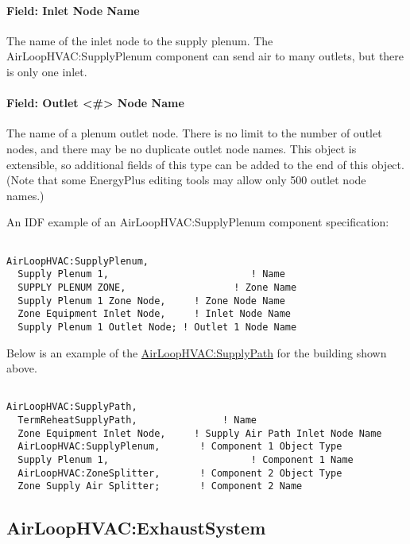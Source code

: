 \paragraph{Field: Inlet Node Name}\label{field-inlet-node-name-1}

The name of the inlet node to the supply plenum. The AirLoopHVAC:SupplyPlenum component can send air to many outlets, but there is only one inlet.

\paragraph{Field: Outlet \textless{}\#\textgreater{} Node Name}\label{field-outlet-node-name-1-000}

The name of a plenum outlet node. There is no limit to the number of outlet nodes, and there may be no duplicate outlet node names.  This object is extensible, so additional fields of this type can be added to the end of this object. (Note that some EnergyPlus editing tools may allow only 500 outlet node names.)

An IDF example of an AirLoopHVAC:SupplyPlenum component specification:

\begin{lstlisting}

AirLoopHVAC:SupplyPlenum,
  Supply Plenum 1,                         ! Name
  SUPPLY PLENUM ZONE,                   ! Zone Name
  Supply Plenum 1 Zone Node,     ! Zone Node Name
  Zone Equipment Inlet Node,     ! Inlet Node Name
  Supply Plenum 1 Outlet Node; ! Outlet 1 Node Name
\end{lstlisting}

Below is an example of the \hyperref[airloophvacsupplypath]{AirLoopHVAC:SupplyPath} for the building shown above.

\begin{lstlisting}

AirLoopHVAC:SupplyPath,
  TermReheatSupplyPath,               ! Name
  Zone Equipment Inlet Node,     ! Supply Air Path Inlet Node Name
  AirLoopHVAC:SupplyPlenum,       ! Component 1 Object Type
  Supply Plenum 1,                         ! Component 1 Name
  AirLoopHVAC:ZoneSplitter,       ! Component 2 Object Type
  Zone Supply Air Splitter;       ! Component 2 Name
\end{lstlisting}

\subsection{AirLoopHVAC:ExhaustSystem}\label{airloophvacexhaustsystem}

